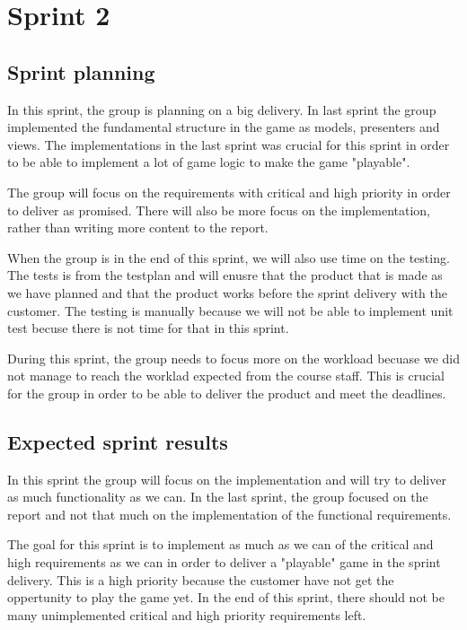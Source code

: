 \section{Sprint 2}

\subsection{Sprint planning}
	In this sprint, the group is planning on a big delivery. In last sprint the group
	implemented the fundamental structure in the game as models, presenters and views. 
	The implementations in the last sprint was crucial for this sprint in order to 
	be able to implement a lot of game logic to make the game "playable".

	The group will focus on the requirements with critical and high priority in order
	to deliver as promised. There will also be more focus on the implementation, rather
	than writing more content to the report.

	When the group is in the end of this sprint, we will also use time on the testing.
	The tests is from the testplan and will enusre that the product that is made
	as we have planned and that the product works before the sprint delivery with the customer. 
	The testing is manually because we will not be able to implement unit test becuse
	there is not time for that in this sprint.

	During this sprint, the group needs to focus more on the workload becuase we did
	not manage to reach the worklad expected from the course staff. This is crucial
	for the group in order to be able to deliver the product and meet the deadlines.

\subsection{Expected sprint results}
	In this sprint the group will focus on the implementation and will try to deliver
	as much functionality as we can. In the last sprint, the group focused on the report
	and not that much on the implementation of the functional requirements. 

	The goal for this sprint is to implement as much as we can of the critical and 
	high requirements as we can in order to deliver a "playable" game in the sprint delivery.
	This is a high priority because the customer have not get the oppertunity to 
	play the game yet. 
	In the end of this sprint, there should not be many unimplemented critical and high 
	priority requirements left. 

